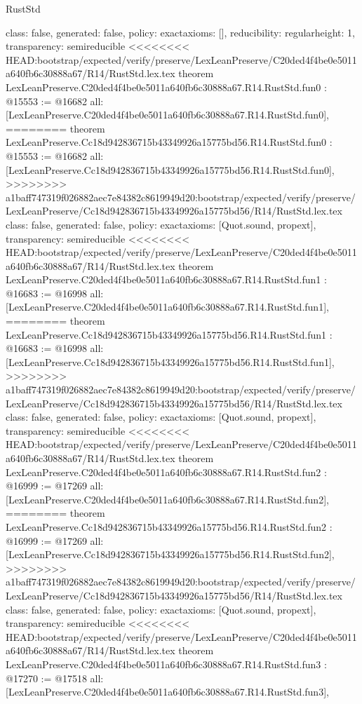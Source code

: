 \begin{lexlean}{RustStd}
\begin{coremodule}
{\begin{coremodule}
{{{  class: false,
  generated: false,
  policy: exact{axioms: []},
  reducibility: regular{height: 1},
  transparency: semireducible
}
<<<<<<<< HEAD:bootstrap/expected/verify/preserve/LexLeanPreserve/C20ded4f4be0e5011a640fb6c30888a67/R14/RustStd.lex.tex
theorem LexLeanPreserve.C20ded4f4be0e5011a640fb6c30888a67.R14.RustStd.fun0 : @15553 := @16682 {
  all: [LexLeanPreserve.C20ded4f4be0e5011a640fb6c30888a67.R14.RustStd.fun0],
========
theorem LexLeanPreserve.Cc18d942836715b43349926a15775bd56.R14.RustStd.fun0 : @15553 := @16682 {
  all: [LexLeanPreserve.Cc18d942836715b43349926a15775bd56.R14.RustStd.fun0],
>>>>>>>> a1baff747319f026882aec7e84382c8619949d20:bootstrap/expected/verify/preserve/LexLeanPreserve/Cc18d942836715b43349926a15775bd56/R14/RustStd.lex.tex
  class: false,
  generated: false,
  policy: exact{axioms: [Quot.sound, propext]},
  transparency: semireducible
}
<<<<<<<< HEAD:bootstrap/expected/verify/preserve/LexLeanPreserve/C20ded4f4be0e5011a640fb6c30888a67/R14/RustStd.lex.tex
theorem LexLeanPreserve.C20ded4f4be0e5011a640fb6c30888a67.R14.RustStd.fun1 : @16683 := @16998 {
  all: [LexLeanPreserve.C20ded4f4be0e5011a640fb6c30888a67.R14.RustStd.fun1],
========
theorem LexLeanPreserve.Cc18d942836715b43349926a15775bd56.R14.RustStd.fun1 : @16683 := @16998 {
  all: [LexLeanPreserve.Cc18d942836715b43349926a15775bd56.R14.RustStd.fun1],
>>>>>>>> a1baff747319f026882aec7e84382c8619949d20:bootstrap/expected/verify/preserve/LexLeanPreserve/Cc18d942836715b43349926a15775bd56/R14/RustStd.lex.tex
  class: false,
  generated: false,
  policy: exact{axioms: [Quot.sound, propext]},
  transparency: semireducible
}
<<<<<<<< HEAD:bootstrap/expected/verify/preserve/LexLeanPreserve/C20ded4f4be0e5011a640fb6c30888a67/R14/RustStd.lex.tex
theorem LexLeanPreserve.C20ded4f4be0e5011a640fb6c30888a67.R14.RustStd.fun2 : @16999 := @17269 {
  all: [LexLeanPreserve.C20ded4f4be0e5011a640fb6c30888a67.R14.RustStd.fun2],
========
theorem LexLeanPreserve.Cc18d942836715b43349926a15775bd56.R14.RustStd.fun2 : @16999 := @17269 {
  all: [LexLeanPreserve.Cc18d942836715b43349926a15775bd56.R14.RustStd.fun2],
>>>>>>>> a1baff747319f026882aec7e84382c8619949d20:bootstrap/expected/verify/preserve/LexLeanPreserve/Cc18d942836715b43349926a15775bd56/R14/RustStd.lex.tex
  class: false,
  generated: false,
  policy: exact{axioms: [Quot.sound, propext]},
  transparency: semireducible
}
<<<<<<<< HEAD:bootstrap/expected/verify/preserve/LexLeanPreserve/C20ded4f4be0e5011a640fb6c30888a67/R14/RustStd.lex.tex
theorem LexLeanPreserve.C20ded4f4be0e5011a640fb6c30888a67.R14.RustStd.fun3 : @17270 := @17518 {
  all: [LexLeanPreserve.C20ded4f4be0e5011a640fb6c30888a67.R14.RustStd.fun3],
}}}}}}
\end{coremodule}}
\end{coremodule}
\end{lexlean}
